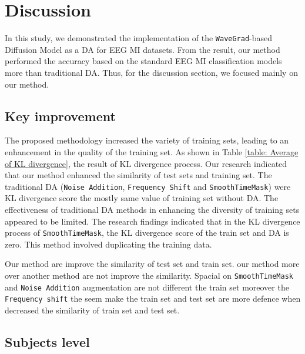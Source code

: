 \documentclass[runningheads]{llncs}
\begin{document}
\section{Discussion}
In this study, we demonstrated the implementation of the \texttt{WaveGrad}-based Diffusion Model as a DA for EEG MI datasets. From the result, our method performed the accuracy based on the standard EEG MI classification models more than traditional DA. Thus, for the discussion section, we focused mainly on our method.

\subsection{Key improvement}

The proposed methodology increased the variety of training sets, leading to an enhancement in the quality of the training set. As shown in Table \ref{table: Average of KL divergence}, the result of KL divergence process. Our research indicated that our method enhanced the similarity of test sets and training set. The traditional DA (\texttt{Noise Addition}, \texttt{Frequency Shift} and \texttt{\texttt{SmoothTimeMask}}) were KL divergence score the mostly same value of  training set without DA. The effectiveness of traditional DA methods in enhancing the diversity of training sets appeared to be limited. The research findings indicated that in the KL divergence process of \texttt{\texttt{SmoothTimeMask}}, the KL divergence score of the train set and DA is zero. This method involved duplicating the training data. 

Our method are improve the similarity of test set and train set. our method more over another method are not improve the similarity. Spacial on \texttt{SmoothTimeMask} and \texttt{Noise Addition} augmentation are not different the train set moreover the \texttt{Frequency shift} the seem make the train set and test set are more defence when decreased the similarity of train set and test set.

\subsection{Subjects level}
\end{document}
